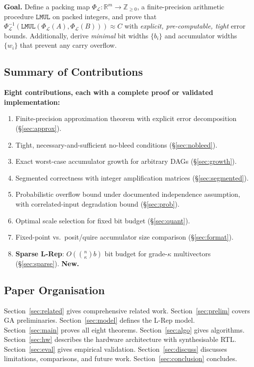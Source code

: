 \documentclass[11pt,a4paper]{article}
\theoremstyle{definition}
\theoremstyle{plain}
\theoremstyle{remark}
\newcommand{\Pack}{\Phi_{\mathcal{L}}}
\newcommand{\Unpack}{\Phi^{-1}_{\mathcal{L}}}
\newcommand{\reals}{\mathbb{R}}
\begin{document}
\begin{keyresult}
\textbf{Goal.}
Define a packing map $\Pack : \reals^m \to \mathbb{Z}_{\ge 0}$, a
finite-precision arithmetic procedure $\mathtt{LMUL}$ on packed
integers, and prove that
$\Unpack(\mathtt{LMUL}(\Pack(A), \Pack(B))) \approx C$
with \emph{explicit, pre-computable, tight} error bounds.
Additionally, derive \emph{minimal} bit widths $\{b_i\}$ and
accumulator widths $\{w_i\}$ that prevent any carry overflow.
\end{keyresult}

\subsection{Summary of Contributions}

\begin{contribution}
\textbf{Eight contributions, each with a complete proof or
validated implementation:}
\begin{enumerate}[label=C\arabic*.]
  \item Finite-precision approximation theorem with explicit error
        decomposition (\S\ref{sec:approx}).
  \item Tight, necessary-and-sufficient no-bleed conditions
        (\S\ref{sec:nobleed}).
  \item Exact worst-case accumulator growth for arbitrary DAGs
        (\S\ref{sec:growth}).
  \item Segmented correctness with integer amplification matrices
        (\S\ref{sec:segmented}).
  \item Probabilistic overflow bound under documented independence
        assumption, with correlated-input degradation bound
        (\S\ref{sec:prob}).
  \item Optimal scale selection for fixed bit budget (\S\ref{sec:quant}).
  \item Fixed-point vs.\ posit/quire accumulator size comparison
        (\S\ref{sec:format}).
  \item \textbf{Sparse L-Rep}: $O(\binom{n}{\kappa} b)$ bit budget for
        grade-$\kappa$ multivectors (\S\ref{sec:sparse}). \textbf{New.}
\end{enumerate}
\end{contribution}

\subsection{Paper Organisation}

Section~\ref{sec:related} gives comprehensive related work.
Section~\ref{sec:prelim} covers GA preliminaries.
Section~\ref{sec:model} defines the L-Rep model.
Section~\ref{sec:main} proves all eight theorems.
Section~\ref{sec:algo} gives algorithms.
Section~\ref{sec:hw} describes the hardware architecture with synthesisable RTL.
Section~\ref{sec:eval} gives empirical validation.
Section~\ref{sec:discuss} discusses limitations, comparisons, and future work.
Section~\ref{sec:conclusion} concludes.
\end{document}

